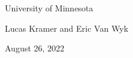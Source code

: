 \documentclass[notes,11pt,aspectratio=169]{beamer}
\begin{document}
\begin{frame}
\begin{center}

{\Large
{}

\vskip 0.25cm
}

\vskip 1cm
University of Minnesota

\medskip
Lucas Kramer and Eric Van Wyk

\bigskip
August 26, 2022

\end{center}
\end{frame}


\end{document}

